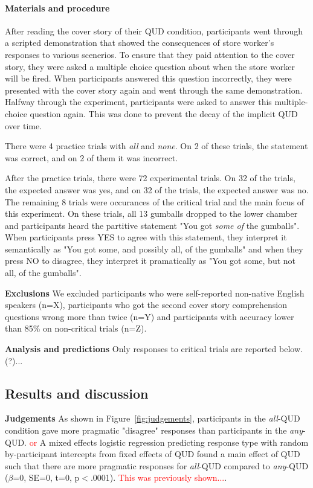 \documentclass[10pt,letterpaper]{article}
\begin{document}
\paragraph{Materials and procedure}
After reading the cover story of their QUD condition, participants went through a scripted demonstration that showed the consequences of store worker's responses to various scenerios. To ensure that they paid attention to the cover story, they were asked a multiple choice question about when the store worker will be fired. When participants answered this question incorrectly, they were presented with the cover story again and went through the same demonstration. Halfway through the experiment, participants were asked to answer this multiple-choice question again. This was done to prevent the decay of the implicit QUD over time.

There were 4 practice trials with \textit{all} and \textit{none}. On 2 of these trials, the statement was correct, and on 2 of them it was incorrect.

After the practice trials, there were 72 experimental trials. On 32 of the trials, the expected answer was yes, and on 32 of the trials, the expected answer was no. The remaining 8 trials were occurances of the critical trial and the main focus of this experiment. On these trials, all 13 gumballs dropped to the lower chamber and participants heard the partitive statement "You got \textit{some of} the gumballs". When participants press YES to agree with this statement, they interpret it semantically as "You got some, and possibly all, of the gumballs" and when they press NO to disagree, they interpret it pramatically as "You got some, but not all, of the gumballs". 

\noindent \textbf{Exclusions} We excluded participants who were self-reported non-native English speakers (n=X), participants who got the second cover story comprehension questions wrong more than twice (n=Y) and participants with accuracy lower than 85\% on non-critical trials (n=Z).

\noindent \textbf{Analysis and predictions} Only responses to critical trials are reported below. (?)...

\subsection{Results and discussion}
\noindent \textbf{Judgements} 
As shown in Figure~\ref{fig:judgements}, participants in the \textit{all}-QUD condition gave more pragmatic "disagree" responses than participants in the \textit{any}-QUD. \textcolor{red}{or} A mixed effects logistic regression predicting response type with random by-participant intercepts from fixed effects of QUD found a main effect of QUD such that there are more pragmatic responses for \textit{all}-QUD compared to \textit{any}-QUD ($\beta$=0, SE=0, t=0, p$<$.0001). \textcolor{red}{This was previously shown...}. 
\end{document}
